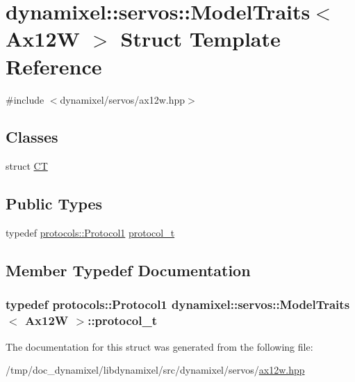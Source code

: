 \hypertarget{structdynamixel_1_1servos_1_1_model_traits_3_01_ax12_w_01_4}{}\section{dynamixel\+:\+:servos\+:\+:Model\+Traits$<$ Ax12W $>$ Struct Template Reference}
\label{structdynamixel_1_1servos_1_1_model_traits_3_01_ax12_w_01_4}


{\ttfamily \#include $<$dynamixel/servos/ax12w.\+hpp$>$}

\subsection*{Classes}
\begin{DoxyCompactItemize}
\item 
struct \hyperlink{structdynamixel_1_1servos_1_1_model_traits_3_01_ax12_w_01_4_1_1_c_t}{CT}
\end{DoxyCompactItemize}
\subsection*{Public Types}
\begin{DoxyCompactItemize}
\item 
typedef \hyperlink{classdynamixel_1_1protocols_1_1_protocol1}{protocols\+::\+Protocol1} \hyperlink{structdynamixel_1_1servos_1_1_model_traits_3_01_ax12_w_01_4_ab1df14eb0d6ea5088102d324f7464591}{protocol\+\_\+t}
\end{DoxyCompactItemize}


\subsection{Member Typedef Documentation}
\subsubsection[{\texorpdfstring{protocol\+\_\+t}{protocol_t}}]{\setlength{\rightskip}{0pt plus 5cm}typedef {\bf protocols\+::\+Protocol1} {\bf dynamixel\+::servos\+::\+Model\+Traits}$<$ {\bf Ax12W} $>$\+::{\bf protocol\+\_\+t}}\hypertarget{structdynamixel_1_1servos_1_1_model_traits_3_01_ax12_w_01_4_ab1df14eb0d6ea5088102d324f7464591}{}\label{structdynamixel_1_1servos_1_1_model_traits_3_01_ax12_w_01_4_ab1df14eb0d6ea5088102d324f7464591}


The documentation for this struct was generated from the following file\+:\begin{DoxyCompactItemize}
\item 
/tmp/doc\+\_\+dynamixel/libdynamixel/src/dynamixel/servos/\hyperlink{ax12w_8hpp}{ax12w.\+hpp}\end{DoxyCompactItemize}
